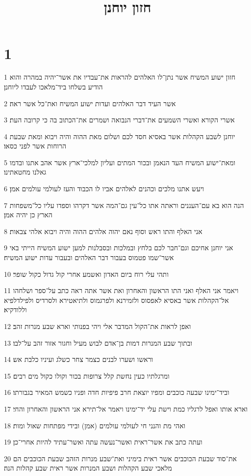 

\title{חזון יוחנן}


\chapter{1}

\par 1 חזון ישוע המשיח אשר נתן־לו האלהים להראות את־עבדיו את אשר־יהיה במהרה והוא הודיע בשלחו ביד־מלאכו לעבדו ליוחנן׃
\par 2 אשר העיד דבר האלהים ועדות ישוע המשיח ואת־כל אשר ראה׃
\par 3 אשרי הקורא ואשרי השמעים את־דברי הנבואה ושמרים את־הכתוב בה כי קרובה העת׃
\par 4 יוחנן לשבע הקהלות אשר באסיא חסד לכם ושלום מאת ההוה והיה ויבוא ומאת שבעת הרוחות אשר לפני כסאו׃
\par 5 ומאת־ישוע המשיח העד הנאמן ובכור המתים ועליון למלכי־ארץ אשר אהב אתנו ובדמו גאלנו מחטאתינו׃
\par 6 ויעש אתנו מלכים וכהנים לאלהים אביו לו הכבוד והעז לעולמי עולמים אמן׃
\par 7 הנה הוא בא עם־העננים וראתה אתו כל־עין גם־המה אשר דקרהו וספדו עליו כל־משפחות הארץ כן יהיה אמן׃
\par 8 אני האלף והתו ראש וסוף נאם יהוה אלהים ההוה והיה ויבוא אלהי צבאות׃
\par 9 אני יוחנן אחיכם וגם־חבר לכם בלחץ ובמלכות ובסבלנות למען ישוע המשיח הייתי באי אשר־שמו פטמוס בעבור דבר האלהים ובעבור עדות ישוע המשיח׃
\par 10 ותהי עלי רוח ביום האדון ואשמע אחרי קול גדול כקול שופר׃
\par 11 ויאמר אני האלף ואני התו הראשון והאחרון ואת אשר אתה ראה כתב על־ספר ושלחהו אל־הקהלות אשר באסיא לאפסוס ולזמירנא ולפרגמוס ולתיאטירא ולסרדיס ולפילדלפיא וללודקיא׃
\par 12 ואפן לראות את־הקול המדבר אלי ויהי בפנותי וארא שבע מנרות זהב׃
\par 13 ובתוך שבע המנרות דמות בן־אדם לבוש מעיל וחגור אזור זהב על־לבו׃
\par 14 וראשו ושערו לבנים כצמר צחר כשלג ועיניו כלבת אש׃
\par 15 ומרגלתיו כעין נחשת קלל צרופות בכור וקולו כקול מים רבים׃
\par 16 וביד־ימינו שבעה כוכבים ומפיו יוצאת חרב פיפיות חדה ופניו כשמש המאיר בגבורתו׃
\par 17 וארא אותו ואפל לרגליו כמת וישת עלי יד־ימינו ויאמר אל־תירא אני הראשון והאחרון והחי׃
\par 18 ואהי מת והנני חי לעולמי עולמים (אמן) ובידי מפתחות שאול ומות׃
\par 19 ועתה כתב את אשר־ראית ואשר־נעשה עתה ואשר־עתיד להיות אחרי־כן׃
\par 20 את־סוד שבעת הכוכבים אשר ראית בימיני ואת־שבע מנרות הזהב שבעת הכוכבים הם מלאכי שבע הקהלות ושבע המנרות אשר ראית שבע קהלות הנה׃

